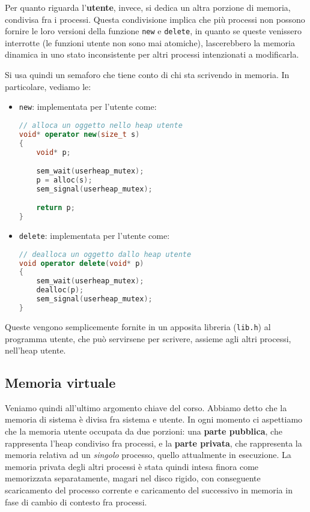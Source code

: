 \documentclass[a4paper,11pt]{article}
\begin{document}
Per quanto riguarda l'\textbf{utente}, invece, si dedica un altra porzione di memoria, condivisa fra i processi.
Questa condivisione implica che più processi non possono fornire le loro versioni della funzione \lstinline|new| e \lstinline|delete|, in quanto se queste venissero interrotte (le funzioni utente non sono mai atomiche), lascerebbero la memoria dinamica in uno stato inconsistente per altri processi intenzionati a modificarla.

Si usa quindi un semaforo che tiene conto di chi sta scrivendo in memoria.
In particolare, vediamo le:
\begin{itemize}
	\item \lstinline|new|: implementata per l'utente come:
\begin{lstlisting}[language=C++, style=codestyle]	
// alloca un oggetto nello heap utente
void* operator new(size_t s)
{
	void* p;

	sem_wait(userheap_mutex);
	p = alloc(s);
	sem_signal(userheap_mutex);

	return p;
}
\end{lstlisting}
	\item \lstinline|delete|: implementata per l'utente come:
\begin{lstlisting}[language=C++, style=codestyle]	
// dealloca un oggetto dallo heap utente
void operator delete(void* p)
{
	sem_wait(userheap_mutex);
	dealloc(p);
	sem_signal(userheap_mutex);
}
\end{lstlisting}
\end{itemize}

Queste vengono semplicemente fornite in un apposita libreria (\lstinline|lib.h|) al programma utente, che può servirsene per scrivere, assieme agli altri processi, nell'heap utente. 

\subsection{Memoria virtuale}
Veniamo quindi all'ultimo argomento chiave del corso.
Abbiamo detto che la memoria di sistema è divisa fra sistema e utente.
In ogni momento ci aspettiamo che la memoria utente occupata da due porzioni: una \textbf{parte pubblica}, che rappresenta l'heap condiviso fra processi, e  la \textbf{parte privata}, che rappresenta la memoria relativa ad un \textit{singolo} processo, quello attualmente in esecuzione.
La memoria privata degli altri processi è stata quindi intesa finora come memorizzata separatamente, magari nel disco rigido, con conseguente scaricamento del processo corrente e caricamento del successivo in memoria in fase di cambio di contesto fra processi.
\end{document}

